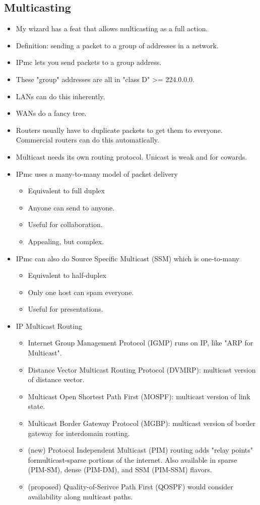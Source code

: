 \documentclass{scrartcl}
\begin{document}
\subsection*{Multicasting}
\begin{itemize}
\item My wizard has a feat that allows multicasting as a full action.
\item Definition: sending a packet to a group of addresses in a network.
\item IPmc lets you send packets to a group address.
\item These "group" addresses are all in "class D" >= 224.0.0.0.
\item LANs can do this inherently.
\item WANs do a fancy tree.
\item Routers usually have to duplicate packets to get them to everyone.
Commercial routers can do this automatically.
\item Multicast needs its own routing protocol. Unicast is weak and for
cowards.
\item IPmc uses a many-to-many model of packet delivery
\begin{itemize}
\item Equivalent to full duplex
\item Anyone can send to anyone.
\item Useful for collaboration.
\item Appealing, but complex.
\end{itemize}
\item IPmc can also do Source Specific Multicast (SSM) which is one-to-many
\begin{itemize}
\item Equivalent to half-duplex
\item Only one host can spam everyone.
\item Useful for presentations.
\end{itemize}
\item IP Multicast Routing
\begin{itemize} 
\item Internet Group Management Protocol (IGMP) runs on IP,
like "ARP for Multicast".
\item Distance Vector Multicast Routing Protocol (DVMRP): multicast
version of distance vector.
\item Multicast Open Shortest Path First (MOSPF): multicast version
of link state.
\item Multicast Border Gateway Protocol (MGBP): multicast version
of border gateway for interdomain routing.
\item (new) Protocol Independent Multicast (PIM) routing adds "relay points" formulticast-sparse portions of the internet. Also
available in sparse (PIM-SM), dense (PIM-DM), and SSM (PIM-SSM) flavors.
\item (proposed) Quality-of-Serivce Path First (QOSPF) would consider
availability along multicast paths.
\end{itemize}
\end{itemize}
\end{document}
